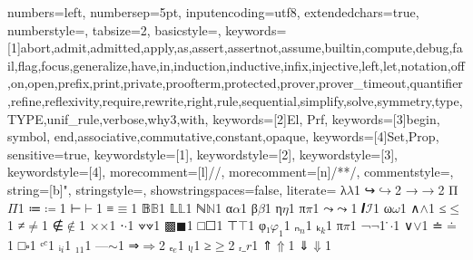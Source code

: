 {
  numbers=left,
  numbersep=5pt,
  inputencoding=utf8,
  extendedchars=true,
  numberstyle=\footnotesize,
  tabsize=2,
  basicstyle={\ttfamily\scriptsize\upshape},
  keywords=[1]{abort,admit,admitted,apply,as,assert,assertnot,assume,builtin,compute,debug,fail,flag,focus,generalize,have,in,induction,inductive,infix,injective,left,let,notation,off,on,open,prefix,print,private,proofterm,protected,prover,prover_timeout,quantifier,refine,reflexivity,require,rewrite,right,rule,sequential,simplify,solve,symmetry,type,TYPE,unif_rule,verbose,why3,with},
  keywords=[2]{El, Prf},
  keywords=[3]{begin, symbol, end,associative,commutative,constant,opaque},
  keywords=[4]{Set,Prop},
  sensitive=true,
  keywordstyle={[1]\bfseries\color{purple}},
  keywordstyle={[2]\bfseries\color{purple}},
  keywordstyle={[3]\bfseries\color{violet}},
  keywordstyle={[4]\bfseries\color{blue}},
  morecomment=[l]{//},
  morecomment=[n]{/*}{*/},
  commentstyle={\itshape\color{teal}},
  string=[b]{"},
  stringstyle=\color{orange},
  showstringspaces=false,
  literate=
  {λ}{$\lambda$}1
  {↪}{$\hookrightarrow$}2
  {→}{$\rightarrow$}2
  {Π}{$\Pi$}1
  {≔}{$\coloneqq$}1
  {⊢}{$\vdash$}1
  {≡}{$\equiv$}1
  {𝔹}{$\mathbb{B}$}1
  {𝕃}{$\mathbb{L}$}1
  {ℕ}{$\mathbb{N}$}1
  {α}{$\alpha$}1
  {β}{$\beta$}1
  {η}{$\eta$}1
  {π}{$\pi$}1
  {⤳}{$\rightcurvedarrow$}1
  {𝑰}{$\mathcal{I}$}1
  {ω}{$\omega$}1
  {∧}{$\wedge$}1
  {≤}{$\le$}1
  {≠}{$\neq$}1
  {∉}{$\notin$}1
  {×}{$\times$}1
  {⋅}{$\cdot$}1
  {⟇}{$\veedot$}1
  {▩}{$\blacksquare$}1
  {□}{$\Square$}1
  {⊤}{$\top$}1
  {φ₁}{$\varphi_1$}1
  {ₙ}{$_n$}1
  {ₖ}{$_k$}1
  {π}{$\pi$}1
  {¬}{$\neg$}1
  { ̇}{$\cdot$}1
  {∨}{$\lor$}1
  {≐}{$\doteq$}1
  {□}{$\square$}1
  {ᶜ}{${^c}$}1
  {ᵢ}{${_i}$}1
  {₁}{${_1}$}1
  {—}{$\sim$}1
  {⇒}{$\Rightarrow$}2
  {ₑ}{${_e}$}1
  {ₗ}{${_l}$}1
  {≥}{$\geq$}2
  {ᵣ}{$\_r$}1
  {⇑}{$\Uparrow$}1
  {⇓}{$\Downarrow$}1
}

